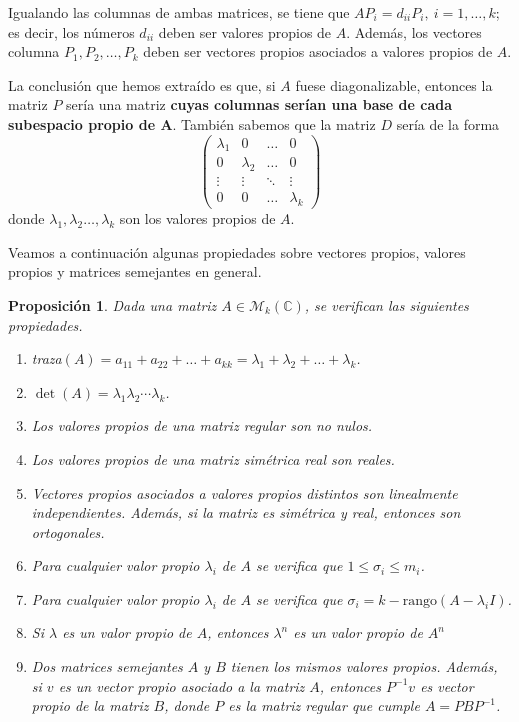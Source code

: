 \documentclass[11pt, a4paper]{article}
\newif\IfInSansMode
\numberwithin{equation}{section}
\newcommand{\bm}[1]{\boldsymbol{#1}}
\newcommand{\la}{\lambda}
\theoremstyle{theorem-style}
\newtheorem{nprop}{Proposición}[section]
\theoremstyle{definition-style}
\theoremstyle{remark-style}
\theoremstyle{example-style}
\newenvironment{nlist}
{\begin{enumerate}
    \renewcommand\labelenumi{(\emph{\roman{enumi})}}}
  {\end{enumerate}}
\begin{document}
Igualando las columnas de ambas matrices, se tiene que $AP_i = d_{ii}P_i, \ i =1,\dots,k$; es decir, los números $d_{ii}$ deben ser valores propios de $A$. Además, los vectores columna $P_1,P_2,\dots,P_k$ deben ser vectores propios asociados a valores propios de $A$.

La conclusión que hemos extraído es que, si $A$ fuese diagonalizable, entonces la matriz $P$ sería una matriz \textbf{cuyas columnas serían una base de cada subespacio propio de $\bm{A}$}. También sabemos que la matriz $D$ sería de la forma $$\begin{pmatrix}
  \lambda_1 & 0 & \hdots & 0 \\
  0 & \lambda_2 & \hdots & 0 \\
  \vdots & \vdots & \ddots & \vdots \\
  0 & 0 & \hdots & \lambda_k
\end{pmatrix}$$ donde $\lambda_1,\lambda_2\dots,\lambda_k$ son los valores propios de $A$.

Veamos a continuación algunas propiedades sobre vectores propios, valores propios y matrices semejantes en general.

\begin{nprop} \label{prop_matrices}
  Dada una matriz $A \in \mathcal M_k(\mathbb C)$, se verifican las siguientes propiedades.
  \begin{nlist}
  \item traza$(A) = a_{11} + a_{22} + \dots + a_{kk} = \lambda_1 + \lambda_2 +
    \dots + \lambda_k$.
  \item $\det(A) = \lambda_1\lambda_2\cdots \lambda_k$.
  \item Los valores propios de una matriz regular son no nulos.
  \item Los valores propios de una matriz simétrica real son reales.
  \item Vectores propios asociados a valores propios distintos son
    linealmente independientes. Además, si la matriz es simétrica y real, entonces son
    ortogonales.
  \item Para cualquier valor propio $\lambda_i$ de $A$ se verifica que $1 \leq \sigma_i
    \leq m_i$. 
    \item Para cualquier valor propio $\la_i$ de $A$ se verifica que $\sigma_i = k - \text{rango}(A - \lambda_i I)$.
    \item Si $\la$ es un valor propio de $A$, entonces $\la^n$ es un valor propio de $A^n$
  \item Dos matrices semejantes $A$ y $B$ tienen los mismos valores
    propios. Además, si $v$ es un vector propio asociado a la matriz $A$,
    entonces $P^{-1}v$ es vector propio de la matriz $B$, donde $P$ es la matriz
    regular que cumple $A = PBP^{-1}$.
  \end{nlist}
\end{nprop}
\end{document}
